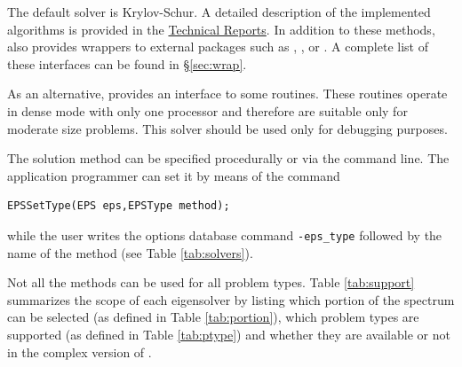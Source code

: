 The default solver is Krylov-Schur. A detailed description of the implemented algorithms is provided in the \hyperlink{str}{\slepc Technical Reports}. In addition to these methods, \slepc also provides wrappers to external packages such as \arpack, \blzpack, or \trlan. A complete list of these interfaces can be found in \S\ref{sec:wrap}.

As an alternative, \slepc provides an interface to some \lapack routines. These routines operate in dense mode with only one processor and therefore are suitable only for moderate size problems. This solver should be used only for debugging purposes.

The solution method can be specified procedurally or via the command line. The application programmer can set it by means of the command
	\begin{Verbatim}[fontsize=\small]
	EPSSetType(EPS eps,EPSType method);
	\end{Verbatim}
while the user writes the options database command \Verb!-eps_type! followed by the name of the method (see Table \ref{tab:solvers}).

	Not all the methods can be used for all problem types. Table \ref{tab:support} summarizes the scope of each eigensolver by listing which portion of the spectrum can be selected (as defined in Table \ref{tab:portion}), which problem types are supported (as defined in Table \ref{tab:ptype}) and whether they are available or not in the complex version of \slepc. %


